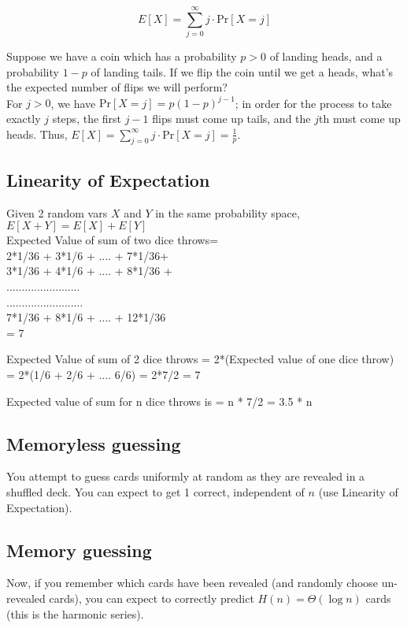 \[
	E[X] = \sum_{j = 0}^\infty j \cdot \text{Pr}[X = j]
\]

Suppose we have a coin which has a probability $p > 0$ of landing heads, and a probability $1 - p$ of landing tails. If we flip the coin until we get a heads, what's the expected number of flips we will perform?\\

For $j > 0$, we have $\text{Pr}[X = j] = p(1 - p)^{j-1}$; in order for the process to take exactly $j$ steps, the first $j - 1$ flips must come up tails, and the $j$th must come up heads. Thus, $E[X] = \sum_{j = 0}^\infty j \cdot \text{Pr}[X = j] = \frac{1}{p}$.

\subsection{Linearity of Expectation}
Given 2 random vars $X$ and $Y$ in the same probability space, $E [X + Y] = E[ X ] + E [ Y ] $\\
Expected Value of sum of two dice throws=\\
2*1/36 + 3*1/6 + .... + 7*1/36+\\
3*1/36 + 4*1/6 + .... + 8*1/36 +\\ 
........................\\
.........................\\
7*1/36 + 8*1/6 + .... + 12*1/36\\     
=  7
  
Expected Value of sum of 2 dice throws = 2*(Expected value of one dice throw)
= 2*(1/6 + 2/6 + .... 6/6)
= 2*7/2
= 7 

Expected value of sum for n dice throws is = n * 7/2 = 3.5 * n 

\subsection{Memoryless guessing}
You attempt to guess cards uniformly at random as they are revealed in a shuffled deck. You can expect to get 1 correct, independent of $n$ (use Linearity of Expectation).

\subsection{Memory guessing}
Now, if you remember which cards have been revealed (and randomly choose un-revealed cards), you can expect to correctly predict $H(n) = \Theta(\log n)$ cards (this is the harmonic series).

